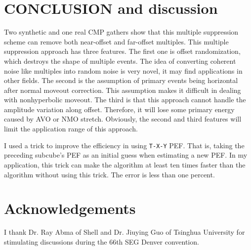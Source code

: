 \section{CONCLUSION and discussion}

Two synthetic and one real CMP gathers show that this multiple 
suppression scheme can remove both near-offset and far-offset multiples. 
This multiple suppression approach has three features. The first 
one is offset randomization, which destroys the shape of multiple events. The 
idea of converting coherent noise like multiples into random noise is very 
novel, it may find applications in other fields. 
The second is the assumption of primary events being horizontal after normal 
moveout correction. This assumption makes it difficult in dealing with 
nonhyperbolic moveout. The third is that this approach cannot handle the 
amplitude variation along offset. Therefore, it will lose some primary energy 
caused by AVO or NMO stretch. Obviously, the second and third features 
will limit the application range of this approach. 

I used a trick to improve the efficiency in using {\tt T-X-Y} PEF. That is, 
taking the preceding subcube's PEF as an initial guess when estimating a new 
PEF. In my application, this trick can make the algorithm at least ten times 
faster than the algorithm without using this trick. The error is less than 
one percent. 

\section{Acknowledgements}

I thank Dr. Ray Abma of Shell and Dr. Jiuying Guo of Tsinghua University for 
stimulating discussions during the 66th SEG Denver convention.



